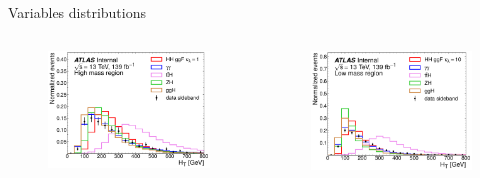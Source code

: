 \begin{frame}{Variables distributions}
\begin{columns}
\begin{figure}
    \centering
    \includegraphics[width=1.\textwidth]{BackUp/Part3/Img/var_SM_HT.pdf}
\end{figure}
\begin{figure}
    \centering
    \includegraphics[width=1.\textwidth]{BackUp/Part3/Img/var_BSM_HT.pdf}
\end{figure}
\end{columns}
\end{frame}

